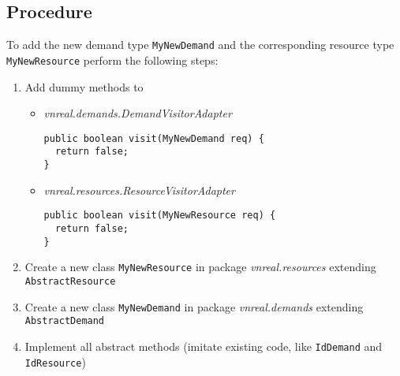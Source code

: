 \subsection{Procedure}
To add the new demand type \texttt{MyNewDemand} and the corresponding resource type \texttt{MyNewResource} perform the following steps: 
\begin{enumerate}
	\item Add dummy methods to
	\begin{itemize}
		\item \textsl{vnreal.demands.DemandVisitorAdapter }
		\begin{lstlisting}
public boolean visit(MyNewDemand req) {
  return false;
}
		\end{lstlisting}
		\item \textsl{vnreal.resources.ResourceVisitorAdapter }
			\begin{lstlisting}
public boolean visit(MyNewResource req) {
  return false;
}
		\end{lstlisting}
	\end{itemize}
	\item Create a new class \texttt{MyNewResource} in package \textit{vnreal.resources} extending \texttt{AbstractResource}
	\item Create a new class \texttt{MyNewDemand} in package \textit{vnreal.demands} extending \texttt{AbstractDemand}
	\item Implement all abstract methods (imitate existing code, like \texttt{IdDemand} and \texttt{IdResource}) 
\end{enumerate}
